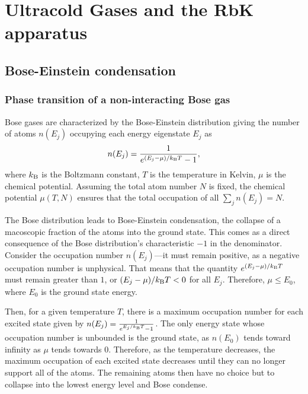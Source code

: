 \renewcommand{\thechapter}{2}

\chapter{Ultracold Gases and the RbK apparatus}\label{chap:Intro}

\section{Bose-Einstein condensation}

\subsection{Phase transition of a non-interacting Bose gas}
Bose gases are characterized by the Bose-Einstein distribution giving the number of atoms $n(E_j)$ occupying each energy eigenstate $E_j$ as
\begin{equation}
n(E_j) = \frac{1}{e^{(E_j-\mu)/k_{\rm B}T}-1},
\end{equation}
where  $k_{\rm B}$ is the Boltzmann constant, $T$ is the temperature in Kelvin, $\mu$ is the chemical potential. Assuming the total atom number $N$ is fixed, the chemical potential $\mu(T,N)$ ensures that the total occupation of all $\sum_j n(E_j)=N$. 

The Bose distribution leads to Bose-Einstein condensation, the collapse of a macoscopic fraction of the atoms into the ground state. This comes as a direct consequence of the Bose distribution's characteristic $-1$ in the denominator. Consider the occupation number $n(E_j)$---it must remain positive, as a negative occupation number is unphysical. That means that the quantity $e^{(E_j-\mu)/k_{\rm B}T}$ must remain greater than $1$, or $(E_j-\mu)/k_{\rm B}T<0$ for all $E_j$. Therefore, $\mu\leq E_0$, where $E_0$ is the ground state energy. 

Then, for a given temperature $T$, there is a maximum occupation number for each excited state given by $n(E_j) = \frac{1}{e^{E_j/k_{\rm B}T}-1}$. The only energy state whose occupation number is unbounded is the ground state, as $n(E_0)$ tends toward infinity as $\mu$ tends towards $0$. Therefore, as the temperature decreases, the maximum occupation of each excited state decreases until they can no longer support all of the atoms. The remaining atoms then have no choice but to collapse into the lowest energy level and Bose condense. 

